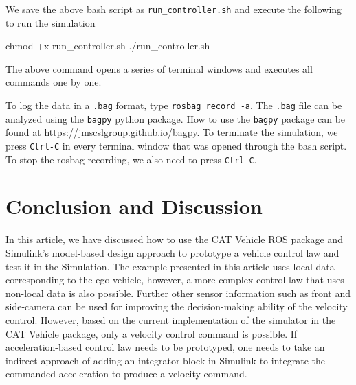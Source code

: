 \documentclass[
]{article}
\newenvironment{Shaded}{\begin{snugshade}}{\end{snugshade}}
\newcommand{\ExtensionTok}[1]{#1}
\newcommand{\FunctionTok}[1]{\textcolor[rgb]{0.00,0.00,0.00}{#1}}
\newcommand{\NormalTok}[1]{#1}
\begin{document}
We save the above bash script as \texttt{run\_controller.sh} and execute
the following to run the simulation

\begin{Shaded}
\begin{Highlighting}[]
\FunctionTok{chmod}\NormalTok{ +x run\_controller.sh}
\ExtensionTok{./run\_controller.sh}
\end{Highlighting}
\end{Shaded}

The above command opens a series of terminal windows and executes all
commands one by one.

To log the data in a \texttt{.bag} format, type
\texttt{rosbag\ record\ -a}. The \texttt{.bag} file can be analyzed
using the \texttt{bagpy} python package. How to use the \texttt{bagpy}
package can be found at \url{https://jmscslgroup.github.io/bagpy}. To
terminate the simulation, we press \texttt{Ctrl-C} in every terminal
window that was opened through the bash script. To stop the rosbag
recording, we also need to press \texttt{Ctrl-C}.

\hypertarget{conclusion-and-discussion}{%
\section{Conclusion and Discussion}\label{conclusion-and-discussion}}

In this article, we have discussed how to use the CAT Vehicle ROS
package and Simulink's model-based design approach to prototype a
vehicle control law and test it in the Simulation. The example presented
in this article uses local data corresponding to the ego vehicle,
however, a more complex control law that uses non-local data is also
possible. Further other sensor information such as front and side-camera
can be used for improving the decision-making ability of the velocity
control. However, based on the current implementation of the simulator
in the CAT Vehicle package, only a velocity control command is possible.
If acceleration-based control law needs to be prototyped, one needs to
take an indirect approach of adding an integrator block in Simulink to
integrate the commanded acceleration to produce a velocity command.

\printbibliography
\end{document}
